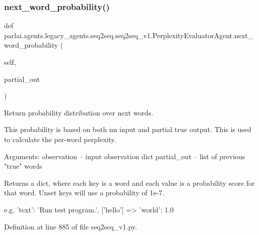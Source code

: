 \subsubsection{\texorpdfstring{next\+\_\+word\+\_\+probability()}{next\_word\_probability()}}
{\footnotesize\ttfamily def parlai.\+agents.\+legacy\+\_\+agents.\+seq2seq.\+seq2seq\+\_\+v1.\+Perplexity\+Evaluator\+Agent.\+next\+\_\+word\+\_\+probability (\begin{DoxyParamCaption}\item[{}]{self,  }\item[{}]{partial\+\_\+out }\end{DoxyParamCaption})}

\begin{DoxyVerb}Return probability distribution over next words.

This probability is based on both nn input and partial true output.
This is used to calculate the per-word perplexity.

Arguments:
observation -- input observation dict
partial_out -- list of previous "true" words

Returns a dict, where each key is a word and each value is a
probability score for that word.
Unset keys will use a probability of 1e-7.

e.g.
{'text': 'Run test program.'}, ['hello'] => {'world': 1.0}
\end{DoxyVerb}
 

Definition at line 885 of file seq2seq\+\_\+v1.\+py.


